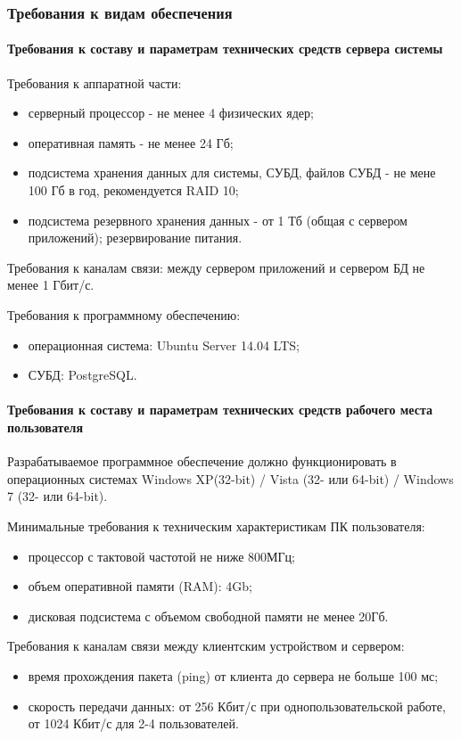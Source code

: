 \documentclass[a4paper]{extarticle}
\begin{document}
\subsubsection{Требования к видам обеспечения}

\paragraph{Требования к составу и параметрам технических средств сервера системы}
Требования к аппаратной части:\par
\begin{itemize}
  \item серверный процессор - не менее 4 физических ядер;
  \item оперативная память - не менее 24 Гб;
  \item подсистема хранения данных для системы, СУБД, файлов СУБД - не мене 100 Гб в год, рекомендуется RAID 10;
  \item подсистема резервного хранения данных - от 1 Тб (общая с сервером приложений); резервирование питания.
\end{itemize}\par
Требования к каналам связи: между сервером приложений и сервером БД не менее 1 Гбит/с.\par
Требования к программному обеспечению:\par
\begin{itemize}
  \item операционная система: Ubuntu Server 14.04 LTS;
  \item СУБД: PostgreSQL.
\end{itemize}\par

\paragraph{Требования к составу и параметрам технических средств рабочего места пользователя}
Разрабатываемое программное обеспечение должно функционировать в операционных системах Windows XP(32-bit) / Vista (32- или 64-bit) / Windows 7 (32- или 64-bit).\par
Минимальные требования к техническим характеристикам ПК пользователя:\par
\begin{itemize}
  \item процессор с тактовой частотой не ниже 800МГц;
  \item объем оперативной памяти (RAM): 4Gb;
  \item дисковая подсистема с объемом свободной памяти не менее 20Гб.
\end{itemize}\par
Требования к каналам связи между клиентским устройством и сервером:\par
\begin{itemize}
  \item время прохождения пакета (ping) от клиента до сервера не больше 100 мс;
  \item скорость передачи данных: от 256 Кбит/с при однопользовательской работе, от 1024 Кбит/с для 2-4 пользователей.
\end{itemize}
\end{document}
